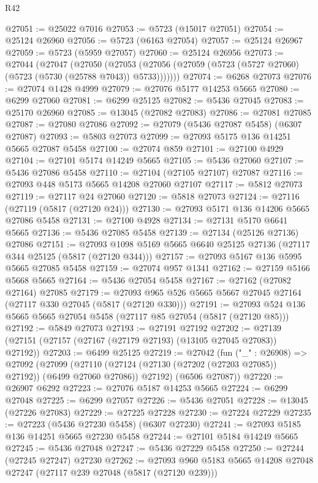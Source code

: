 \begin{lexlean}{R42}
\begin{coremodule}
@27051 := @25022 @7016
@27053 := @5723 (@15017 @27051)
@27054 := @25124 @26960
@27056 := @5723 (@6163 @27054)
@27057 := @25124 @26967
@27059 := @5723 (@5959 @27057)
@27060 := @25124 @26956
@27073 := @27044
    (@27047
      (@27050
        (@27053 (@27056 (@27059 (@5723 (@5727 @27060) (@5723 (@5730 (@25788 @7043)) @5733)))))))
@27074 := @6268 @27073
@27076 := @27074 @1428 @4999
@27079 := @27076 @5177 @14253 @5665
@27080 := @6299 @27060
@27081 := @6299 @25125
@27082 := @5436 @27045
@27083 := @25170 @26960
@27085 := @13045 (@27082 @27083)
@27086 := @27081 @27085
@27087 := @27080 @27086
@27092 := @27079 (@5436 @27087 @5458) (@6307 @27087)
@27093 := @5803 @27073
@27099 := @27093 @5175 @136 @14251 @5665 @27087 @5458
@27100 := @27074 @859
@27101 := @27100 @4929
@27104 := @27101 @5174 @14249 @5665
@27105 := @5436 @27060
@27107 := @5436 @27086 @5458
@27110 := @27104 (@27105 @27107) @27087
@27116 := @27093 @448 @5173 @5665 @14208 @27060 @27107
@27117 := @5812 @27073
@27119 := @27117 @24 @27060
@27120 := @5818 @27073
@27124 := @27116 (@27119 (@5817 (@27120 @24)))
@27130 := @27093 @5171 @136 @14206 @5665 @27086 @5458
@27131 := @27100 @4928
@27134 := @27131 @5170 @6641 @5665
@27136 := @5436 @27085 @5458
@27139 := @27134 (@25126 @27136) @27086
@27151 := @27093 @1098 @5169 @5665 @6640 @25125 @27136 (@27117 @344 @25125 (@5817 (@27120 @344)))
@27157 := @27093 @5167 @136 @5995 @5665 @27085 @5458
@27159 := @27074 @957 @1341
@27162 := @27159 @5166 @5668 @5665
@27164 := @5436 @27054 @5458
@27167 := @27162 (@27082 @27164) @27085
@27179 := @27093 @965 @526 @5665 @5667 @27045 @27164 (@27117 @330 @27045 (@5817 (@27120 @330)))
@27191 := @27093 @524 @136 @5665 @5665 @27054 @5458 (@27117 @85 @27054 (@5817 (@27120 @85)))
@27192 := @5849 @27073
@27193 := @27191 @27192
@27202 := @27139 (@27151 (@27157 (@27167 (@27179 @27193) (@13105 @27045 @27083)) @27192))
@27203 := @6499 @25125
@27219 := @27042
    (fun ("_" : @26908) =>
    @27092
      (@27099
        (@27110 (@27124 (@27130 (@27202 (@27203 @27085)) @27192)) (@6499 @27060 @27086))
        @27192)
      (@6506 @27087))
@27220 := @26907 @6292
@27223 := @27076 @5187 @14253 @5665
@27224 := @6299 @27048
@27225 := @6299 @27057
@27226 := @5436 @27051
@27228 := @13045 (@27226 @27083)
@27229 := @27225 @27228
@27230 := @27224 @27229
@27235 := @27223 (@5436 @27230 @5458) (@6307 @27230)
@27241 := @27093 @5185 @136 @14251 @5665 @27230 @5458
@27244 := @27101 @5184 @14249 @5665
@27245 := @5436 @27048
@27247 := @5436 @27229 @5458
@27250 := @27244 (@27245 @27247) @27230
@27262 := @27093 @960 @5183 @5665 @14208 @27048 @27247 (@27117 @239 @27048 (@5817 (@27120 @239)))

\end{coremodule}
\end{lexlean}
